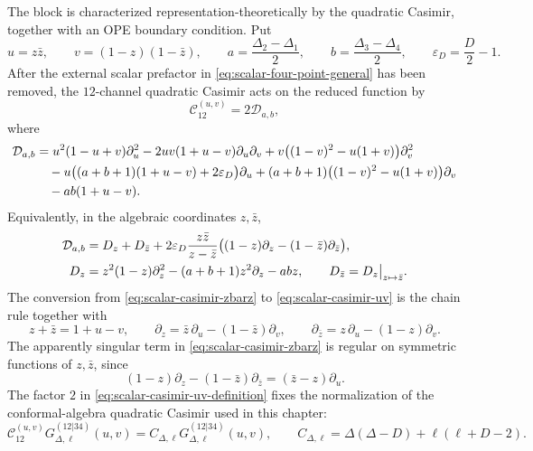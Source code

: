 The block is characterized representation-theoretically by the quadratic
Casimir, together with an OPE boundary condition.  Put
\[
  u=z\bar z,\qquad v=(1-z)(1-\bar z),
  \qquad
  a=\frac{\Delta_2-\Delta_1}{2},\qquad
  b=\frac{\Delta_3-\Delta_4}{2},
  \qquad
  \varepsilon_D=\frac D2-1 .
\]
After the external scalar prefactor in
\eqref{eq:scalar-four-point-general} has been removed, the \(12\)-channel
quadratic Casimir acts on the reduced function by
\begin{equation}
  \mathcal C_{12}^{(u,v)}=2\mathcal D_{a,b},
  \label{eq:scalar-casimir-uv-definition}
\end{equation}
where
\begin{align}
  \mathcal D_{a,b}
  &=
  u^2(1-u+v)\partial_u^2
  -2uv(1+u-v)\partial_u\partial_v
  +v\bigl((1-v)^2-u(1+v)\bigr)\partial_v^2
  \notag\\
  &\quad
  -u\bigl((a+b+1)(1+u-v)+2\varepsilon_D\bigr)\partial_u
  +(a+b+1)\bigl((1-v)^2-u(1+v)\bigr)\partial_v
  \notag\\
  &\quad
  -ab(1+u-v).
  \label{eq:scalar-casimir-uv}
\end{align}
Equivalently, in the algebraic coordinates \(z,\bar z\),
\begin{align}
  \mathcal D_{a,b}
  &=
  D_z+D_{\bar z}
  +
  2\varepsilon_D
  \frac{z\bar z}{z-\bar z}
  \bigl((1-z)\partial_z-(1-\bar z)\partial_{\bar z}\bigr),
  \label{eq:scalar-casimir-zbarz}
  \\
  D_z
  &=
  z^2(1-z)\partial_z^2
  -(a+b+1)z^2\partial_z
  -abz,
  \qquad
  D_{\bar z}=D_z\big|_{z\mapsto\bar z}.
  \notag
\end{align}
The conversion from \eqref{eq:scalar-casimir-zbarz} to
\eqref{eq:scalar-casimir-uv} is the chain rule together with
\[
  z+\bar z=1+u-v,\qquad
  \partial_z=\bar z\,\partial_u-(1-\bar z)\partial_v,\qquad
  \partial_{\bar z}=z\,\partial_u-(1-z)\partial_v .
\]
The apparently singular term in \eqref{eq:scalar-casimir-zbarz} is regular on
symmetric functions of \(z,\bar z\), since
\[
  (1-z)\partial_z-(1-\bar z)\partial_{\bar z}
  =
  (\bar z-z)\partial_u .
\]
The factor \(2\) in \eqref{eq:scalar-casimir-uv-definition} fixes the
normalization of the conformal-algebra quadratic Casimir used in this chapter:
\begin{equation}
  \mathcal C_{12}^{(u,v)}
  G_{\Delta,\ell}^{(12|34)}(u,v)
  =
  C_{\Delta,\ell}
  G_{\Delta,\ell}^{(12|34)}(u,v),
  \qquad
  C_{\Delta,\ell}
  =
  \Delta(\Delta-D)+\ell(\ell+D-2).
  \label{eq:scalar-block-casimir-equation}
\end{equation}
